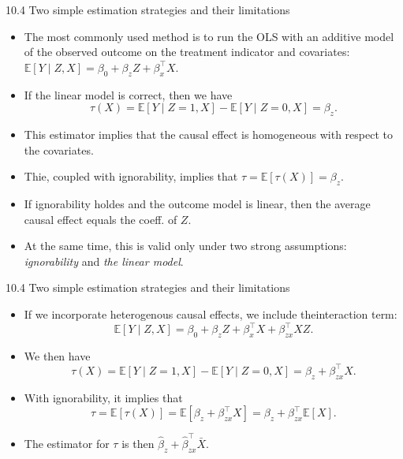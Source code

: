 \documentclass[aspectratio=169, 12pt]{beamer}
\begin{document}
\begin{frame}{10.4 Two simple estimation strategies and their limitations}
  \begin{itemize}
    \item The most commonly used method is to run the OLS with an additive model of the observed outcome on the treatment indicator and covariates: $\mathbb{E}[Y\mid Z,X]=\beta_0+\beta_zZ+\beta_x^{\top}X$.
    \item If the linear model is correct, then we have \[\tau(X)=\mathbb{E}[Y\mid Z=1,X]-\mathbb{E}[Y\mid Z=0,X]=\beta_z.\]
    \item This estimator implies that the causal effect is homogeneous with respect to the covariates.
    \item Thie, coupled with ignorability, implies that $\tau=\mathbb{E}[\tau(X)]=\beta_z$.
    \item If ignorability holdes and the outcome model is linear, then the average causal effect equals the coeff. of $Z$.
    \item At the same time, this is valid only under two strong assumptions: \textit{ignorability} and \textit{the linear model}.
  \end{itemize}
\end{frame}

\begin{frame}{10.4 Two simple estimation strategies and their limitations}
  \begin{itemize}
    \item If we incorporate heterogenous causal effects, we include theinteraction term:
    \[
    \mathbb{E}[Y\mid Z,X] = \beta_0+\beta_zZ+\beta_x^{\top}X+\beta_{zx}^{\top}XZ.
    \]
    \item We then have
    \[
    \tau(X) = \mathbb{E}[Y\mid Z=1,X] - \mathbb{E}[Y\mid Z=0,X] = \beta_z+\beta_{zx}^{\top}X.
    \]
    \item With ignorability, it implies that 
    \[
    \tau = \mathbb{E}[\tau(X)] = \mathbb{E}[\beta_z+\beta_{zx}^{\top}X] = \beta_z + \beta_{zx}^{\top}\mathbb{E}[X].
    \]
    \item The estimator for $\tau$ is then $\hat{\beta}_z + \hat{\beta}_{zx}^{\top}\bar{X}.$
  \end{itemize}
\end{frame}
\end{document}
